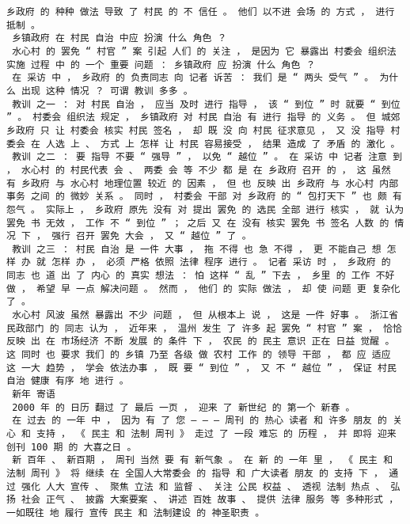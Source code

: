 \documentclass{article}
\begin{document}
\begin{Verbatim}[commandchars=\\\{\}]
 乡政府 的 种种 做法 导致 了 村民 的 不 信任 。 他们 以不进 会场 的 方式 ， 进行 抵制 。 
 乡镇政府 在 村民 自治 中应 扮演 什么 角色 ？ 
 水心村 的 罢免 “ 村官 ” 案 引起 人们 的 关注 ， 是因为 它 暴露出 村委会 组织法 实施 过程 中 的 一个 重要 问题 ： 乡镇政府 应 扮演 什么 角色 ？ 
 在 采访 中 ， 乡政府 的 负责同志 向 记者 诉苦 ： 我们 是 “ 两头 受气 ” 。 为什么 出现 这种 情况 ？ 可谓 教训 多多 。 
 教训 之一 ： 对 村民 自治 ， 应当 及时 进行 指导 ， 该 “ 到位 ” 时 就要 “ 到位 ” 。 村委会 组织法 规定 ， 乡镇政府 对 村民 自治 有 进行 指导 的 义务 。 但 城郊 乡政府 只 让 村委会 核实 村民 签名 ， 却 既 没 向 村民 征求意见 ， 又 没 指导 村委会 在 人选 上 、 方式 上 怎样 让 村民 容易接受 ， 结果 造成 了 矛盾 的 激化 。 
 教训 之二 ： 要 指导 不要 “ 强导 ” ， 以免 “ 越位 ” 。 在 采访 中 记者 注意 到 ， 水心村 的 村民代表 会 、 两委 会 等 不少 都 是 在 乡政府 召开 的 ， 这 虽然 有 乡政府 与 水心村 地理位置 较近 的 因素 ， 但 也 反映 出 乡政府 与 水心村 内部事务 之间 的 微妙 关系 。 同时 ， 村委会 干部 对 乡政府 的 “ 包打天下 ” 也 颇 有 怨气 。 实际上 ， 乡政府 原先 没有 对 提出 罢免 的 选民 全部 进行 核实 ， 就 认为 罢免 书 无效 ， 工作 不 “ 到位 ” ； 之后 又 在 没有 核实 罢免 书 签名 人数 的 情况 下 ， 强行 召开 罢免 大会 ， 又 “ 越位 ” 了 。 
 教训 之三 ： 村民 自治 是 一件 大事 ， 拖 不得 也 急 不得 ， 更 不能自己 想 怎样 办 就 怎样 办 ， 必须 严格 依照 法律 程序 进行 。 记者 采访 时 ， 乡政府 的 同志 也 道 出 了 内心 的 真实 想法 ： 怕 这样 “ 乱 ” 下去 ， 乡里 的 工作 不好 做 ， 希望 早 一点 解决问题 。 然而 ， 他们 的 实际 做法 ， 却 使 问题 更 复杂化 了 。 
 水心村 风波 虽然 暴露出 不少 问题 ， 但 从根本上 说 ， 这是 一件 好事 。 浙江省 民政部门 的 同志 认为 ， 近年来 ， 温州 发生 了 许多 起 罢免 “ 村官 ” 案 ， 恰恰 反映 出 在 市场经济 不断 发展 的 条件 下 ， 农民 的 民主 意识 正在 日益 觉醒 。 这 同时 也 要求 我们 的 乡镇 乃至 各级 做 农村 工作 的 领导 干部 ， 都 应 适应 这 一大 趋势 ， 学会 依法办事 ， 既 要 “ 到位 ” ， 又 不 “ 越位 ” ， 保证 村民 自治 健康 有序 地 进行 。 
 新年 寄语 
 2000 年 的 日历 翻过 了 最后 一页 ， 迎来 了 新世纪 的 第一个 新春 。 
 在 过去 的 一年 中 ， 因为 有 了 您 — — — 周刊 的 热心 读者 和 许多 朋友 的 关心 和 支持 ， 《 民主 和 法制 周刊 》 走过 了 一段 难忘 的 历程 ， 并 即将 迎来 创刊 100 期 的 大喜之日 。 
 新 百年 、 新百期 ， 周刊 当然 要 有 新气象 。 在 新 的 一年 里 ， 《 民主 和 法制 周刊 》 将 继续 在 全国人大常委会 的 指导 和 广大读者 朋友 的 支持 下 ， 通过 强化 人大 宣传 、 聚焦 立法 和 监督 、 关注 公民 权益 、 透视 法制 热点 、 弘扬 社会 正气 、 披露 大案要案 、 讲述 百姓 故事 、 提供 法律 服务 等 多种形式 ， 一如既往 地 履行 宣传 民主 和 法制建设 的 神圣职责 。 

\end{Verbatim}
\end{document}
